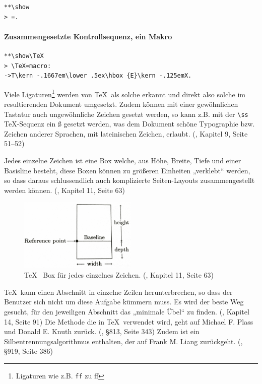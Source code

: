 \begin{verbatim}
**\show
> =.
\end{verbatim}

\paragraph{Zusammengesetzte Kontrollsequenz, ein Makro}

\begin{verbatim}
**\show\TeX
> \TeX=macro:
->T\kern -.1667em\lower .5ex\hbox {E}\kern -.125emX.
\end{verbatim}

Viele Ligaturen\footnote{Ligaturen wie z.B. \lstinline|ff| zu ff}
werden von \TeX~als solche erkannt und direkt also solche
im resultierenden Dokument umgesetzt. Zudem können mit einer gewöhnlichen
Tastatur auch ungewöhnliche Zeichen gesetzt werden, so kann z.B. mit der
\lstinline|\ss| \TeX-Sequenz ein ß gesetzt werden, was dem Dokument
schöne Typographie bzw. Zeichen anderer Sprachen, mit lateinischen
Zeichen, erlaubt. (\cite{tex-a}, Kapitel 9, Seite 51--52)

Jedes einzelne Zeichen ist eine Box welche, aus Höhe, Breite, Tiefe und
einer Basisline besteht, diese Boxen können
zu größeren Einheiten „verklebt“ werden, so dass daraus schlussendlich
auch komplizierte Seiten-Layouts zusammengestellt werden können.
(\cite{tex-a}, Kapitel 11, Seite 63)

\begin{figure}[h!]
  \centering
    \includegraphics[width=0.5\textwidth]{figures/tex_box.png}
  \caption{\TeX~ Box für jedes einzelnes Zeichen.
           (\cite{tex-a}, Kapitel 11, Seite 63)}\label{fig-tex_box}
\end{figure}

\TeX~kann einen Abschnitt in einzelne Zeilen herunterbrechen, so dass
der Benutzer sich nicht um diese Aufgabe kümmern muss. Es wird der beste
Weg gesucht, für den jeweiligen Abschnitt das „minimale Übel“ zu finden.
(\cite{tex-a}, Kapitel 14, Seite 91)
Die Methode die in \TeX~verwendet wird, geht auf Michael F. Plass
und Donald E. Knuth zurück. (\cite{tex-b}, §813, Seite 343)
Zudem ist ein Silbentrennungsalgorithmus enthalten, der auf
Frank M. Liang zurückgeht. (\cite{tex-b}, §919, Seite 386)

